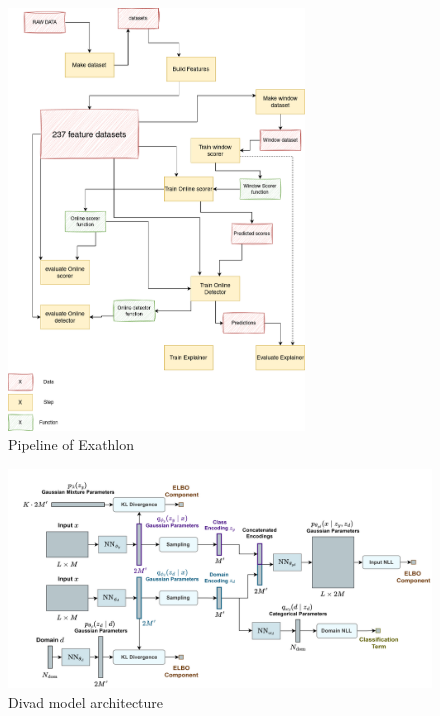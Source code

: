 \documentclass[oneside, a4paper, onecolumn, 11pt]{article}
\begin{document}
\begin{figure}[h]
    \centering
    \includegraphics[width=0.7\textwidth]{images/pipeline.drawio.png} %
    \caption{Pipeline of Exathlon}
    \label{fig:pipeline}
\end{figure}
\begin{figure}[h]
  \centering
  \includegraphics[width=1\textwidth]{images/divad model.png} %
  \caption{Divad model architecture}
  \label{fig:divad_arch}
\end{figure}
\end{document}
